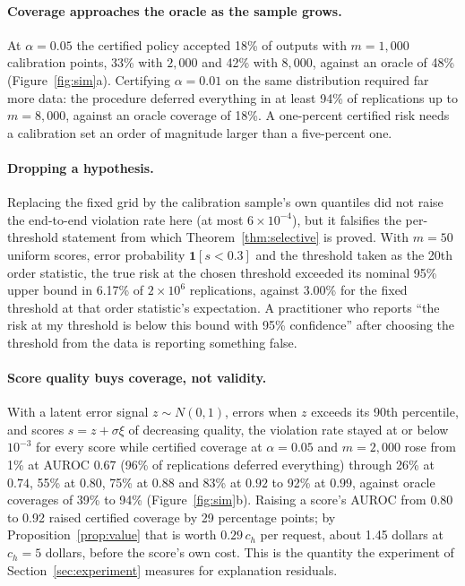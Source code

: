 \documentclass[11pt,letterpaper]{article}
\newcommand{\ind}[1]{\mathbf{1}[#1]}
\theoremstyle{plain}
\theoremstyle{definition}
\theoremstyle{remark}
\begin{document}
\paragraph{Coverage approaches the oracle as the sample grows.} At $\alpha=0.05$ the certified policy accepted 18\% of outputs with $m=1{,}000$ calibration points, 33\% with $2{,}000$ and 42\% with $8{,}000$, against an oracle of 48\% (Figure~\ref{fig:sim}a). Certifying $\alpha=0.01$ on the same distribution required far more data: the procedure deferred everything in at least 94\% of replications up to $m=8{,}000$, against an oracle coverage of 18\%. A one-percent certified risk needs a calibration set an order of magnitude larger than a five-percent one.

\paragraph{Dropping a hypothesis.} Replacing the fixed grid by the calibration sample's own quantiles did not raise the end-to-end violation rate here (at most $6\times10^{-4}$), but it falsifies the per-threshold statement from which Theorem~\ref{thm:selective} is proved. With $m=50$ uniform scores, error probability $\ind{s<0.3}$ and the threshold taken as the 20th order statistic, the true risk at the chosen threshold exceeded its nominal 95\% upper bound in 6.17\% of $2\times10^{6}$ replications, against 3.00\% for the fixed threshold at that order statistic's expectation. A practitioner who reports ``the risk at my threshold is below this bound with 95\% confidence'' after choosing the threshold from the data is reporting something false.

\paragraph{Score quality buys coverage, not validity.} With a latent error signal $z\sim N(0,1)$, errors when $z$ exceeds its 90th percentile, and scores $s=z+\sigma\xi$ of decreasing quality, the violation rate stayed at or below $10^{-3}$ for every score while certified coverage at $\alpha=0.05$ and $m=2{,}000$ rose from 1\% at AUROC $0.67$ (96\% of replications deferred everything) through 26\% at $0.74$, 55\% at $0.80$, 75\% at $0.88$ and 83\% at $0.92$ to 92\% at $0.99$, against oracle coverages of 39\% to 94\% (Figure~\ref{fig:sim}b). Raising a score's AUROC from 0.80 to 0.92 raised certified coverage by 29 percentage points; by Proposition~\ref{prop:value} that is worth $0.29\,c_h$ per request, about 1.45 dollars at $c_h=5$ dollars, before the score's own cost. This is the quantity the experiment of Section~\ref{sec:experiment} measures for explanation residuals.
\end{document}
